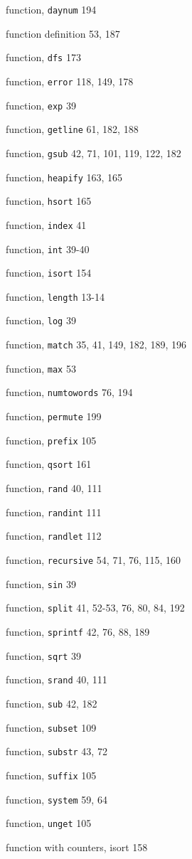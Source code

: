\begin{multicols}{2}
function, \verb'daynum' 194

function definition 53, 187

function, \verb'dfs' 173

function, \verb'error' 118, 149, 178

function, \verb'exp' 39

function, \verb'getline' 61, 182, 188

function, \verb'gsub' 42, 71, 101, 119, 122, 182

function, \verb'heapify' 163, 165

function, \verb'hsort' 165

function, \verb'index' 41

function, \verb'int' 39-40

function, \verb'isort' 154

function, \verb'length' 13-14

function, \verb'log' 39

function, \verb'match' 35, 41, 149, 182, 189, 196

function, \verb'max' 53

function, \verb'numtowords' 76, 194

function, \verb'permute' 199

function, \verb'prefix' 105

function, \verb'qsort' 161

function, \verb'rand' 40, 111

function, \verb'randint' 111

function, \verb'randlet' 112

function, \verb'recursive' 54, 71, 76, 115, 160

function, \verb'sin' 39

function, \verb'split' 41, 52-53, 76, 80, 84, 192

function, \verb'sprintf' 42, 76, 88, 189

function, \verb'sqrt' 39

function, \verb'srand' 40, 111

function, \verb'sub' 42, 182

function, \verb'subset' 109

function, \verb'substr' 43, 72

function, \verb'suffix' 105

function, \verb'system' 59, 64

function, \verb'unget' 105

function with counters, isort 158


\end{multicols}
